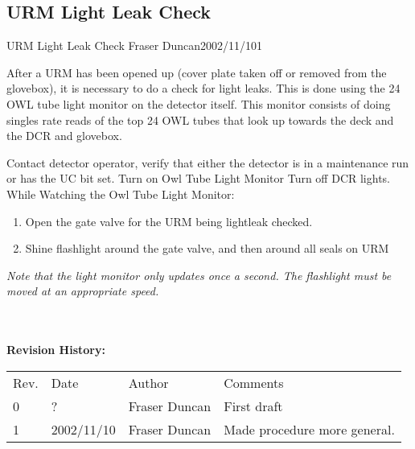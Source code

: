 \newpage
\subsection{URM Light Leak Check}
             {URM Light Leak Check}
             {Fraser Duncan}{2002/11/10}{1}


  After a URM has been opened up (cover plate taken off or removed
from the  glovebox), it is necessary to do a check for light  leaks.
This is done using the 24 OWL tube light monitor on the detector
itself.  This monitor consists of doing singles rate reads of the
top 24 OWL tubes that look up towards the deck and the DCR and 
glovebox.  


\begin{enumerate}
\checkitem Contact detector operator, verify that either the detector
  is in a maintenance run or has the UC bit set.
\checkitem Turn on Owl Tube Light Monitor
\checkitem Turn off DCR lights.
\checkitem While Watching the Owl Tube Light Monitor:
  \begin{enumerate}
  \item Open the gate valve for the URM being lightleak checked.
  \item Shine flashlight around the gate valve, 
         and then around all seals on URM
  \end{enumerate}
  \small
  {\em
    Note that the light monitor only updates once a second.  The
    flashlight must be moved at an appropriate speed.
  }
  \normalsize
\end{enumerate}
 
  



{\small
~\\
~\\
\noindent
{\bf Revision History:}\\
\begin{tabular}{llll}
Rev. & Date & Author & Comments\\
0           & 
?  & 
Fraser Duncan &
\parbox[t]{3.0in}{
  First draft
}\\

1             & 
2002/11/10    & 
Fraser Duncan &
\parbox[t]{3.0in}{
  Made procedure more general.
}
\end{tabular}
}



